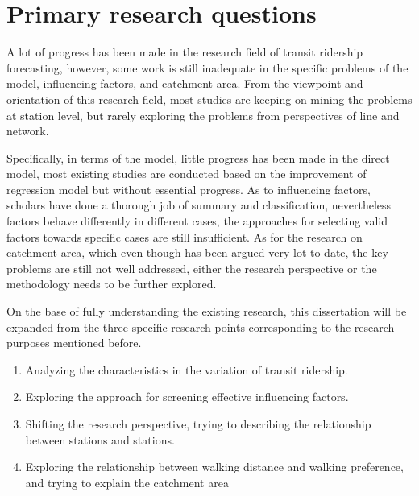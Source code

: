 %
\section{Primary research questions}
A lot of progress has been made in the research field of transit ridership forecasting, however, some work is still inadequate in the specific problems of the model, influencing factors, and catchment area. From the viewpoint and orientation of this research field, most studies are keeping on mining the problems at station level, but rarely exploring the problems from perspectives of line and network. 

Specifically, in terms of the model, little progress has been made in the direct model, most existing studies are conducted based on the improvement of regression model but without essential progress. As to influencing factors, scholars have done a thorough job of summary and classification, nevertheless factors behave differently in different cases, the approaches for selecting valid factors towards specific cases are still insufficient. As for the research on catchment area, which even though has been argued very lot to date, the key problems are still not well addressed, either the research perspective or the methodology needs to be further explored.

On the base of fully understanding the existing research, this dissertation will be expanded from the three specific research points corresponding to the research purposes mentioned before.

\begin{enumerate}
	\setlength{\parskip}{0\baselineskip} %
	\item Analyzing the characteristics in the variation of transit ridership.
	\item Exploring the approach for screening effective influencing factors.
	\item Shifting the research perspective, trying to describing the relationship between stations and stations.
	\item Exploring the relationship between walking distance and walking preference, and trying to explain the catchment area
	\setlength{\parskip}{0.7\baselineskip} %
\end{enumerate}

%
